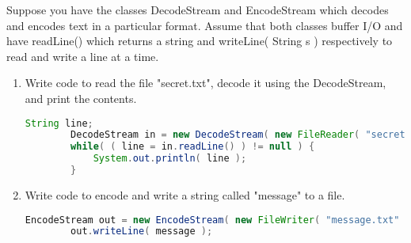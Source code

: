 Suppose you have the classes DecodeStream and EncodeStream which decodes and encodes text in a particular format.
Assume that both classes buffer I/O and have readLine() which returns a string and writeLine( String s ) respectively to read and write a line at a time.
\begin{enumerate}
\item Write code to read the file "secret.txt", decode it using the DecodeStream, and print the contents.
\begin{answer}
	\begin{lstlisting}[language=java]
		String line;
		DecodeStream in = new DecodeStream( new FileReader( "secret.txt" ) );
		while( ( line = in.readLine() ) != null ) {
			System.out.println( line );
		}
	\end{lstlisting}
\end{answer}
\item Write code to encode and write a string called "message" to a file.
\begin{answer}
	\begin{lstlisting}[language=java]
		EncodeStream out = new EncodeStream( new FileWriter( "message.txt" ) );
		out.writeLine( message );
	\end{lstlisting}
\end{answer}
\end{enumerate}
\vspace{24pt}
